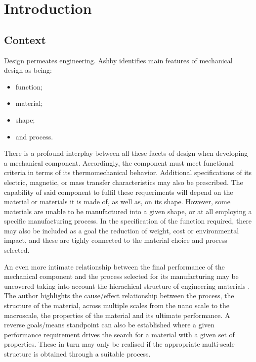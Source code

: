 \chapter{Introduction}

\section{Context}

Design permeates engineering.
Ashby \citep{} identifies main features of mechanical design as being:
\begin{itemize}
    \item function;
    \item material;
    \item shape;
    \item and process.
\end{itemize}
There is a profound interplay between all these facets of design when developing a mechanical component.
Accordingly, the component must meet functional criteria in terms of its thermomechanical behavior.
Additional specifications of its electric, magnetic, or mass transfer characteristics may also be prescribed.
The capability of said component to fulfil these requeriments will depend on the material or materials it is made of, as well as, on its shape.
However, some materials are unable to be manufactured into a given shape, or at all employing a specific manufacturing process.
In the specification of the function required, there may also be included as a goal the reduction of weight, cost or environmental impact, and these are tighly connected to the material choice and process selected.

An even more intimate relationship between the final performance of the mechanical component and the process selected for its manufacturing may be uncovered taking into account the hierachical structure of engineering materials \citep{}.
The author highlights the cause/effect relationship between the process, the structure of the material, across multiple scales from the nano scale to the macroscale, the properties of the material and its ultimate performance.
A reverse goals/means standpoint can also be established where a given performance requirement drives the search for a material with a given set of properties.
These in turn may only be realised if the appropriate multi-scale structure is obtained through a suitable process.

